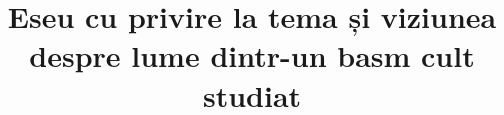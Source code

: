 

\title{Eseu cu privire la tema și viziunea despre lume dintr-un basm cult studiat}


 \maketitle %
 

